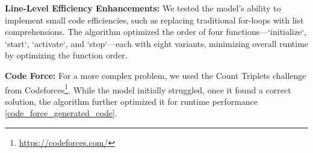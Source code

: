 

\textbf{Line-Level Efficiency Enhancements:}
We tested the model's ability to implement small code efficiencies, such as replacing traditional for-loops with list comprehensions. The algorithm optimized the order of four functions—`initialize`, `start`, `activate`, and `stop`—each with eight variants, minimizing overall runtime by optimizing the function order.

\textbf{Code Force:} For a more complex problem, we used the Count Triplets challenge from Codeforces\footnote{\url{https://codeforces.com/}}. While the model initially struggled, once it found a correct solution, the algorithm further optimized it for runtime performance \ref{code_force_generated_code}.

